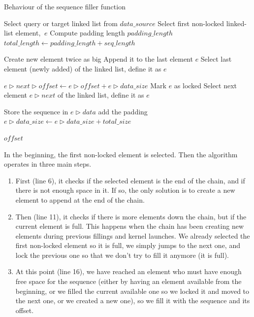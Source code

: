 \begin{algorithm}[h!]
	\caption{Behaviour of the sequence filler function}
	\label{algo:extensiblefunction}
	\begin{algorithmic}[1] %
		
		\State Select query or target linked list from $data\_source$
		\State Select first non-locked linked-list element, $~e$
		\State Compute padding length $padding\_length$
		\State $total\_length \leftarrow padding\_length + seq\_length$
		
			\State Create new element twice as big
			\State Append it to the last element $e$
			\State Select last element (newly added) of the linked list, define it as $e$
		\EndIf
		
			\State $e\rhd next\rhd offset \leftarrow e\rhd offset + e\rhd data\_size $
			\State Mark $e$ as locked
			\State Select next element $e\rhd next$ of the linked list, define it as $e$
		\EndIf
		
			\State Store the sequence in $e\rhd data$ add the padding
			\State $e\rhd data\_size \leftarrow e\rhd data\_size + total\_size$
		
		
		\Return $offset$
		\EndFunction
		
	\end{algorithmic}
\end{algorithm}

In the beginning, the first non-locked element is selected. Then the algorithm operates in three main steps. 

\begin{enumerate}
	\item First (line 6), it checks if the selected element is the end of the chain, and if there is not enough space in it. If so, the only solution is to create a new element to append at the end of the chain.
	\item Then (line 11), it checks if there is more elements down the chain, but if the current element is full. This happens when the chain has been creating new elements during previous fillings and kernel launches. We already selected the first non-locked element so it is full, we simply jumps to the next one, and lock the previous one so that we don't try to fill it anymore (it is full).
	\item At this point (line 16), we have reached an element who must have enough free space for the sequence (either by having an element available from the beginning, or we filled the current available one so we locked it and moved to the next one, or we created a new one), so we fill it with the sequence and its offset.
\end{enumerate}


